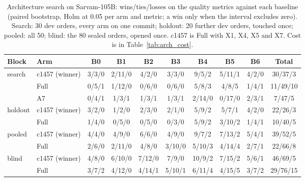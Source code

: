 \begin{table}[!t]
\centering\small
\begin{adjustbox}{max width=\textwidth}
\begin{tabular}{@{}llcccccccc@{}}
\toprule
Block & Arm & B0 & B1 & B2 & B3 & B4 & B5 & B6 & Total \\
\midrule
search & c1457 (winner) & 3/3/0 & 2/11/0 & 4/2/0 & 3/3/0 & 9/5/2 & 5/11/1 & 4/2/0 & 30/37/3 \\
 & Full & 0/5/1 & 1/12/0 & 0/6/0 & 0/6/0 & 5/8/3 & 4/8/5 & 1/4/1 & 11/49/10 \\
 & A7 & 0/4/1 & 1/3/1 & 1/3/1 & 1/3/1 & 2/14/0 & 0/17/0 & 2/3/1 & 7/47/5 \\
holdout & c1457 (winner) & 3/2/0 & 1/2/0 & 2/3/0 & 2/1/0 & 5/9/2 & 5/7/1 & 4/2/0 & 22/26/3 \\
 & Full & 1/4/0 & 0/5/0 & 0/5/0 & 0/3/0 & 5/9/2 & 3/10/2 & 1/4/1 & 10/40/5 \\
pooled & c1457 (winner) & 4/4/0 & 4/9/0 & 6/6/0 & 4/9/0 & 9/7/2 & 7/13/2 & 5/4/1 & 39/52/5 \\
 & Full & 2/6/0 & 2/11/0 & 4/8/0 & 3/10/0 & 5/10/3 & 4/14/4 & 2/7/1 & 22/66/8 \\
blind & c1457 (winner) & 4/8/0 & 6/10/0 & 7/12/0 & 7/9/0 & 10/9/2 & 7/15/2 & 5/6/1 & 46/69/5 \\
 & Full & 3/7/2 & 4/12/0 & 4/14/1 & 5/10/1 & 6/11/4 & 4/15/5 & 3/7/2 & 29/76/15 \\
\bottomrule
\end{tabular}
\end{adjustbox}
\caption{Architecture search on Sarvam-105B: wins/ties/losses on the quality metrics against each baseline (paired bootstrap, Holm at 0.05 per arm and metric; a win only when the interval excludes zero). Search: 30 dev orders, every arm on one commit; holdout: 20 further dev orders, touched once; pooled: all 50; blind: the 80 sealed orders, opened once. c1457 is Full with X1, X4, X5 and X7. Cost is in Table~\ref{tab:arch_cost}.}
\label{tab:arch_wlt}
\end{table}
